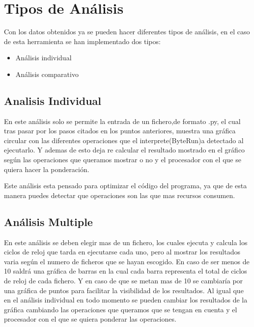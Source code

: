 \section{Tipos de Análisis}
Con los datos obtenidos ya se pueden hacer diferentes tipos de análisis, en el caso de esta herramienta se han implementado dos tipos:
\begin{itemize}
	\item Análisis individual
	\item Análisis comparativo
\end{itemize}
 

\subsection{Analisis Individual}
En este análisis solo se permite la entrada de un fichero,de formato .py, el cual tras pasar por los pasos citados en los puntos anteriores, muestra una gráfica circular con las diferentes operaciones que el interprete(ByteRun)a detectado al ejecutarlo. Y ademas de esto  deja re calcular el resultado mostrado en el gráfico según las operaciones que queramos mostrar o no y el procesador  con el que se quiera hacer la ponderación.\\



Este análisis esta pensado para optimizar el código del programa, ya que de esta manera puedes detectar que operaciones son las que mas recursos consumen.

\subsection{Análisis Multiple}
En este análisis se deben elegir mas de un fichero, los cuales ejecuta y calcula los ciclos de reloj que tarda en ejecutarse cada uno, pero al mostrar los resultados varia según el numero  de ficheros que  se hayan escogido. En caso de ser menos de 10 saldrá una gráfica de barras en la cual cada barra representa el total de ciclos de reloj de cada fichero. Y en caso de que se metan mas de 10 se cambiaría por una  gráfica de puntos para facilitar la visibilidad de los resultados. Al igual que en el análisis  individual en todo momento se pueden cambiar los resultados  de la gráfica cambiando las operaciones que queramos que se tengan en cuenta y el procesador  con el que se quiera ponderar las operaciones.\\

